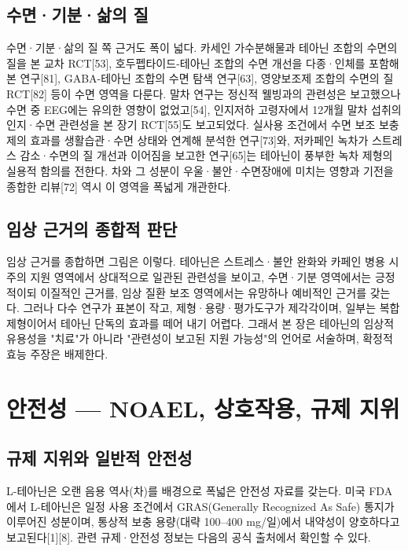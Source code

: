 \documentclass[12pt,oneside]{book}
\begin{document}
\subsection{수면·기분·삶의 질}

수면·기분·삶의 질 쪽 근거도 폭이 넓다. 카세인 가수분해물과 테아닌 조합의 수면의 질을 본 교차 RCT[53], 호두펩타이드-테아닌 조합의 수면 개선을 다종·인체를 포함해 본 연구[81], GABA-테아닌 조합의 수면 탐색 연구[63], 영양보조제 조합의 수면의 질 RCT[82] 등이 수면 영역을 다룬다. 말차 연구는 정신적 웰빙과의 관련성은 보고했으나 수면 중 EEG에는 유의한 영향이 없었고[54], 인지저하 고령자에서 12개월 말차 섭취의 인지·수면 관련성을 본 장기 RCT[55]도 보고되었다. 실사용 조건에서 수면 보조 보충제의 효과를 생활습관·수면 상태와 연계해 분석한 연구[73]와, 저카페인 녹차가 스트레스 감소·수면의 질 개선과 이어짐을 보고한 연구[65]는 테아닌이 풍부한 녹차 제형의 실용적 함의를 전한다. 차와 그 성분이 우울·불안·수면장애에 미치는 영향과 기전을 종합한 리뷰[72] 역시 이 영역을 폭넓게 개관한다.

\subsection{임상 근거의 종합적 판단}

임상 근거를 종합하면 그림은 이렇다. 테아닌은 스트레스·불안 완화와 카페인 병용 시 주의 지원 영역에서 상대적으로 일관된 관련성을 보이고, 수면·기분 영역에서는 긍정적이되 이질적인 근거를, 임상 질환 보조 영역에서는 유망하나 예비적인 근거를 갖는다. 그러나 다수 연구가 표본이 작고, 제형·용량·평가도구가 제각각이며, 일부는 복합 제형이어서 테아닌 단독의 효과를 떼어 내기 어렵다. 그래서 본 장은 테아닌의 임상적 유용성을 "치료"가 아니라 "관련성이 보고된 지원 가능성"의 언어로 서술하며, 확정적 효능 주장은 배제한다.

\section{안전성 — NOAEL, 상호작용, 규제 지위}

\subsection{규제 지위와 일반적 안전성}

L-테아닌은 오랜 음용 역사(차)를 배경으로 폭넓은 안전성 자료를 갖는다. 미국 FDA에서 L-테아닌은 일정 사용 조건에서 GRAS(Generally Recognized As Safe) 통지가 이루어진 성분이며, 통상적 보충 용량(대략 100–400 mg/일)에서 내약성이 양호하다고 보고된다[1][8]. 관련 규제·안전성 정보는 다음의 공식 출처에서 확인할 수 있다.
\end{document}
